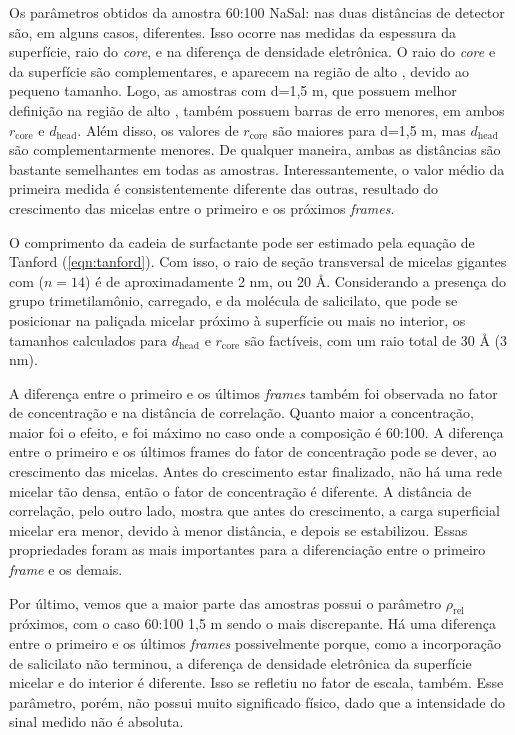 	Os parâmetros obtidos da amostra 60:100 NaSal:\TTAB{} nas duas distâncias de detector são, em alguns casos, diferentes. Isso ocorre nas medidas da espessura da superfície, raio do \emph{core}, e na diferença de densidade eletrônica. O raio do \emph{core} e da superfície são complementares, e aparecem na região de alto \q, devido ao pequeno tamanho. Logo, as amostras com d=1,5 m, que possuem melhor definição na região de alto \q, também possuem barras de erro menores, em ambos \(r_{\mathrm{core}}\) e \(d_{\mathrm{head}}\). Além disso, os valores de \(r_{\mathrm{core}}\) são maiores para d=1,5 m, mas \(d_\mathrm{head}\) são complementarmente menores. De qualquer maneira, ambas as distâncias são bastante semelhantes em todas as amostras. Interessantemente, o valor médio da primeira medida é consistentemente diferente das outras, resultado do crescimento das micelas entre o primeiro e os próximos \emph{frames}.
	
	O comprimento da cadeia de surfactante pode ser estimado pela equação de Tanford (\autoref{eqn:tanford}). Com isso, o raio de seção transversal de micelas gigantes com \TTAB{} (\(n=14\)) é de aproximadamente 2 nm, ou 20 \AA. Considerando a presença do grupo trimetilamônio, carregado, e da molécula de salicilato, que pode se posicionar na paliçada micelar próximo à superfície ou mais no interior, os tamanhos calculados para \(d_{\mathrm{head}}\) e \(r_{\mathrm{core}}\) são factíveis, com um raio total de 30 \AA{} (3 nm).

	A diferença entre o primeiro e os últimos \emph{frames} também foi observada no fator de concentração e na distância de correlação. Quanto maior a concentração, maior foi o efeito, e foi máximo no caso onde a composição é 60:100. A diferença entre o primeiro e os últimos frames do fator de concentração pode se dever, ao crescimento das micelas. Antes do crescimento estar finalizado, não há uma rede micelar tão densa, então o fator de concentração é diferente. A distância de correlação, pelo outro lado, mostra que antes do crescimento, a carga superficial micelar era menor, devido à menor distância, e depois se estabilizou. Essas propriedades foram as mais importantes para a diferenciação entre o primeiro \emph{frame} e os demais.
	
	Por último, vemos que a maior parte das amostras possui o parâmetro \(\rho_{\mathrm{rel}}\) próximos, com o caso 60:100 1,5 m sendo o mais discrepante. Há uma diferença entre o primeiro e os últimos \emph{frames} possivelmente porque, como a incorporação de salicilato não terminou, a diferença de densidade eletrônica da superfície micelar e do interior é diferente. Isso se refletiu no fator de escala, também. Esse parâmetro, porém, não possui muito significado físico, dado que a intensidade do sinal medido não é absoluta.
	
